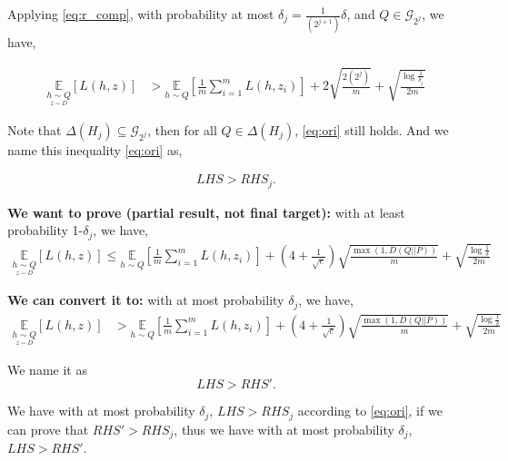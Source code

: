 \documentclass{article}
\begin{document}
Applying \eqref{eq:r_comp}, with probability at most $\delta_j = \frac{1}{(2^{j+1})}\delta$, and $Q \in \mathcal{G}_{2^j}$, we have,

\begin{align}
    \underset{\underset{z \sim D}{h \sim Q}}{\mathbb{E}}[L(h, z)] 
    &> \underset{h \sim Q}{\mathbb{E}}\left[\frac{1}{m} \sum_{i=1}^{m} L\left(h, z_{i}\right)\right]+
    2 \sqrt{\frac{2 (2^j)}{m}}
    +\sqrt{\frac{\log \frac{1}{\delta_j}}{2 m}} \label{eq:ori}
\end{align}

Note that $\Delta(H_j) \subseteq \mathcal{G}_{2^j}$, then for all  $Q \in \Delta(H_j)$, \eqref{eq:ori} still holds. And we name this inequality \eqref{eq:ori} as,

\begin{align}
    LHS > RHS_j.
\end{align}



\textbf{We want to prove (partial result, not final target):} with at least probability 1-$\delta_j$, we have,
\begin{align}
    \underset{\underset{z \sim D}{h \sim Q}}{\mathbb{E}}[L(h, z)] \leq \underset{h \sim Q}{\mathbb{E}}\left[\frac{1}{m} \sum_{i=1}^{m} L\left(h, z_{i}\right)\right]
    + ( 4 + \frac{1}{\sqrt{e}} )\sqrt{\frac{\max{(1,D(Q||P))}}{m}} + \sqrt{\frac{\log \frac{1}{\delta}}{2 m}}\label{eq:target}
\end{align}


\textbf{We can convert it to:} with at most probability $\delta_j$, we have,
\begin{align}
    \underset{\underset{z \sim D}{h \sim Q}}{\mathbb{E}}[L(h, z)] &> \underset{h \sim Q}{\mathbb{E}}\left[\frac{1}{m} \sum_{i=1}^{m} L\left(h, z_{i}\right)\right]
    + ( 4 + \frac{1}{\sqrt{e}} )\sqrt{\frac{\max{(1,D(Q||P))}}{m}} + \sqrt{\frac{\log \frac{1}{\delta}}{2 m}} \label{eq:LR_i}
\end{align}

We name it as
\begin{equation}
    LHS > RHS'.
\end{equation}


We have with at most probability $\delta_j$, $LHS > RHS_j$ according to \eqref{eq:ori}, if we can prove that $RHS' > RHS_j$, thus we have with at most probability $\delta_j$, $LHS > RHS'$.
\end{document}
